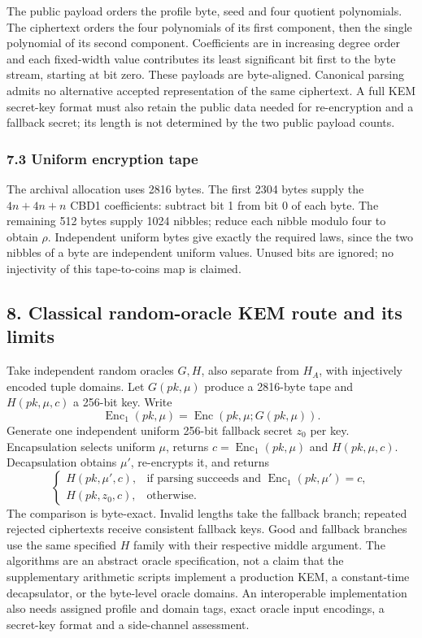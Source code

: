 \documentclass[
  10pt,
  a4paper,
]{article}
\begin{document}
The public payload orders the profile byte, seed and four quotient
polynomials. The ciphertext orders the four polynomials of its first
component, then the single polynomial of its second component.
Coefficients are in increasing degree order and each fixed-width value
contributes its least significant bit first to the byte stream, starting
at bit zero. These payloads are byte-aligned. Canonical parsing admits
no alternative accepted representation of the same ciphertext. A full
KEM secret-key format must also retain the public data needed for
re-encryption and a fallback secret; its length is not determined by the
two public payload counts.

\subsubsection{7.3 Uniform encryption
tape}\label{uniform-encryption-tape}

The archival allocation uses 2816 bytes. The first 2304 bytes supply the
\(4n+4n+n\) CBD1 coefficients: subtract bit 1 from bit 0 of each byte.
The remaining 512 bytes supply 1024 nibbles; reduce each nibble modulo
four to obtain \(\rho\). Independent uniform bytes give exactly the
required laws, since the two nibbles of a byte are independent uniform
values. Unused bits are ignored; no injectivity of this tape-to-coins
map is claimed.

\subsection{8. Classical random-oracle KEM route and its
limits}\label{classical-random-oracle-kem-route-and-its-limits}

Take independent random oracles \(G,H\), also separate from \(H_A\),
with injectively encoded tuple domains. Let \(G(pk,\mu)\) produce a
2816-byte tape and \(H(pk,\mu,c)\) a 256-bit key. Write \[
\operatorname{Enc}_1(pk,\mu)=\operatorname{Enc}(pk,\mu;G(pk,\mu)).
\] Generate one independent uniform 256-bit fallback secret \(z_0\) per
key. Encapsulation selects uniform \(\mu\), returns
\(c=\operatorname{Enc}_1(pk,\mu)\) and \(H(pk,\mu,c)\). Decapsulation
obtains \(\mu'\), re-encrypts it, and returns \[
\begin{cases}
H(pk,\mu',c),&\text{if parsing succeeds and }\operatorname{Enc}_1(pk,\mu')=c,\\
H(pk,z_0,c),&\text{otherwise}.
\end{cases}
\] The comparison is byte-exact. Invalid lengths take the fallback
branch; repeated rejected ciphertexts receive consistent fallback keys.
Good and fallback branches use the same specified \(H\) family with
their respective middle argument. The algorithms are an abstract oracle
specification, not a claim that the supplementary arithmetic scripts
implement a production KEM, a constant-time decapsulator, or the
byte-level oracle domains. An interoperable implementation also needs
assigned profile and domain tags, exact oracle input encodings, a
secret-key format and a side-channel assessment.
\end{document}
